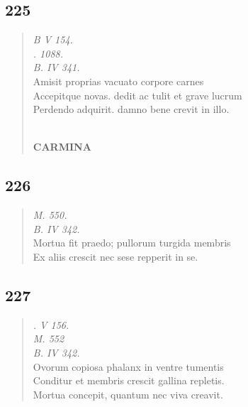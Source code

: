 \documentclass[11pt, a4paper]{report}
\begin{document}
            \subsection*{225}
      \begin{verse}
      \textit{B V 154.} \\ \textit{. 1088.} \\ \textit{B. IV 341.} \\ Amisit proprias vacuato corpore carnes \\ Accepitque novas. dedit ac tulit et grave lucrum \\ Perdendo adquirit. damno bene crevit in illo. \\ 
        ﻿\pagebreak 
     \marginpar{[190]} \begin{center} \textbf{CARMINA} \end{center}
      \end{verse}
  
            \subsection*{226}
      \begin{verse}
      \textit{M. 550.} \\ \textit{B. IV 342.} \\ Mortua fit praedo; pullorum turgida membris \\ Ex aliis crescit nec sese repperit in se. \\ 
      \end{verse}
  
            \subsection*{227}
      \begin{verse}
      \textit{. V 156.} \\ \textit{M. 552} \\ \textit{B. IV 342.} \\ Ovorum copiosa phalanx in ventre tumentis \\ Conditur et membris crescit gallina repletis. \\ Mortua concepit, quantum nec viva creavit. \\ 
      \end{verse}
  
\end{document}
